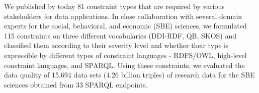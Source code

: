 \documentclass[conference]{IEEEtran}
\begin{document}


We published by today 81 constraint types that are required by various stakeholders for data applications.
In close collaboration with several domain experts for the social, behavioral, and economic (SBE) sciences, we formulated 115 constraints on three different vocabularies (DDI-RDF, QB, SKOS) and classified them according to their severity level and  whether their type is expressible by different types of constraint languages - RDFS/OWL, high-level constraint languages, and SPARQL. 
Using these constraints, we evaluated  the data quality of 15,694 data sets (4.26 billion triples) of research data for the SBE sciences obtained from 33 SPARQL endpoints.
\end{document}
